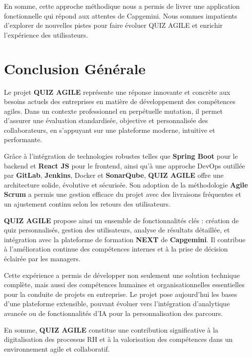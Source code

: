 \documentclass[12pt,a4paper,twoside]{report}
\begin{document}
En somme, cette approche méthodique nous a permis de livrer une
application fonctionnelle qui répond aux attentes de Capgemini. Nous
sommes impatients d'explorer de nouvelles pistes pour faire évoluer QUIZ
AGILE et enrichir l'expérience des utilisateurs.

\hypertarget{conclusion-guxe9nuxe9rale-1}{%
\section{Conclusion Générale}\label{conclusion-guxe9nuxe9rale-1}}

\protect\hypertarget{_Toc204179750}{}{}Le projet \textbf{QUIZ AGILE}
représente une réponse innovante et concrète aux besoins actuels des
entreprises en matière de développement des compétences agiles. Dans un
contexte professionnel en perpétuelle mutation, il permet d'assurer une
évaluation standardisée, objective et personnalisée des collaborateurs,
en s'appuyant sur une plateforme moderne, intuitive et performante.

Grâce à l'intégration de technologies robustes telles que \textbf{Spring
Boot} pour le backend et \textbf{React JS} pour le frontend, ainsi qu'à
une approche DevOps outillée par \textbf{GitLab}, \textbf{Jenkins},
Docker et \textbf{SonarQube}, \textbf{QUIZ AGILE} offre une architecture
solide, évolutive et sécurisée. Son adoption de la méthodologie
\textbf{Agile Scrum} a permis une gestion efficace du projet avec des
livraisons fréquentes et un ajustement continu selon les retours des
utilisateurs.

\textbf{QUIZ AGILE} propose ainsi un ensemble de fonctionnalités clés :
création de quiz personnalisés, gestion des utilisateurs, analyse de
résultats détaillée, et intégration avec la plateforme de formation
\textbf{NEXT} de \textbf{Capgemini}. Il contribue à l'amélioration
continue des compétences internes et à la prise de décision éclairée par
les managers.

Cette expérience a permis de développer non seulement une solution
technique complète, mais aussi des compétences humaines et
organisationnelles essentielles pour la conduite de projets en
entreprise. Le projet pose aujourd'hui les bases d'une plateforme
extensible, pouvant évoluer vers l'intégration d'analytique avancée ou
de fonctionnalités d'IA pour la personnalisation des parcours.

En somme, \textbf{QUIZ AGILE} constitue une contribution significative à
la digitalisation des processus RH et à la valorisation des compétences
dans un environnement agile et collaboratif.
\end{document}
